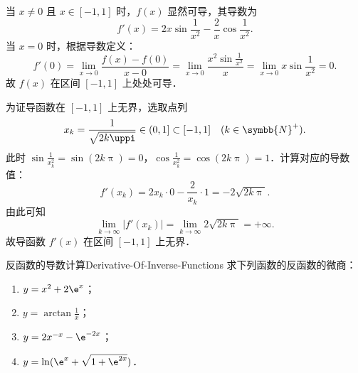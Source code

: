 \begin{myproof}
    当 $x \neq 0$ 且 $x \in [-1, 1]$ 时，$f(x)$ 显然可导，其导数为
    \begin{equation}
        f'(x) = 2x \sin \frac{1}{x^2} - \frac{2}{x}\cos \frac{1}{x^2}.
    \end{equation}
    当 $x = 0$ 时，根据导数定义：
    \begin{equation}
        f'(0) = \lim_{x\to 0} \frac{f(x) - f(0)}{x - 0} = \lim_{x\to 0} \frac{x^2\sin \frac{1}{x^2}}{x} = \lim_{x\to 0} x\sin \frac{1}{x^2} = 0.
    \end{equation}
    故 $f(x)$ 在区间 $[-1, 1]$ 上处处可导．

    为证导函数在 $[-1, 1]$ 上无界，选取点列
    \begin{equation}
        x_k = \frac{1}{\sqrt{2k\uppi}} \in (0, 1] \subset [-1, 1] \quad (k \in \symbb{N}^+).
    \end{equation}
    此时 $\sin\frac{1}{x_k^2} = \sin(2k\uppi) = 0$，$\cos\frac{1}{x_k^2} = \cos(2k\uppi) = 1$．计算对应的导数值：
    \begin{equation}
        f'(x_k) = 2x_k \cdot 0 - \frac{2}{x_k} \cdot 1 = -2\sqrt{2k\uppi}.
    \end{equation}
    由此可知
    \begin{equation}
        \lim_{k\to\infty} |f'(x_k)| = \lim_{k\to\infty} 2\sqrt{2k\uppi} = +\infty.
    \end{equation}
    故导函数 $f'(x)$ 在区间 $[-1, 1]$ 上无界．
\end{myproof}

\begin{problem}{反函数的导数计算}{Derivative-Of-Inverse-Functions}
    求下列函数的反函数的微商：
    \begin{enumerate}
        \item $y = x^2 + 2\e^x$；
        \item $y = \arctan \frac{1}{x}$；
        \item $y = 2x^{-x} - \e^{-2x}$；
        \item $y = \ln(\e^x + \sqrt{1+\e^{2x}})$．
    \end{enumerate}
\end{problem}

